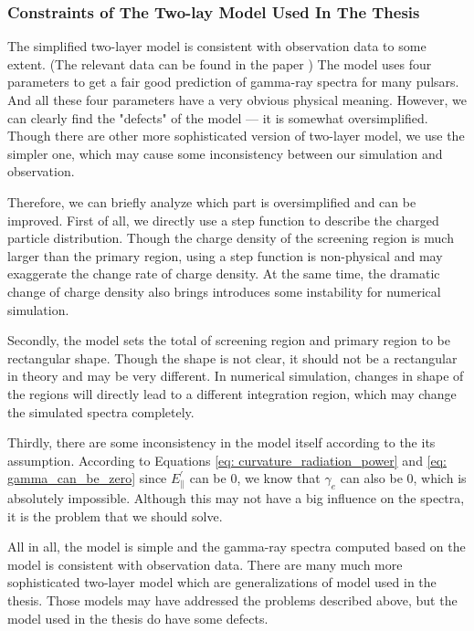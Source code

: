 \documentclass[12pt]{report}
\begin{document}
      \subsubsection{Constraints of The Two-lay Model Used In The Thesis} 
        The simplified two-layer model is consistent with observation data to some extent. 
        (The relevant data can be found in the paper \cite{0004-637X-720-1-178})
        The model uses four parameters to get a fair good prediction of gamma-ray spectra for many 
        pulsars. And all these four parameters have a very obvious physical meaning. 
        However, we can clearly find the "defects" of the model --- it is somewhat oversimplified. 
        Though there are other more sophisticated version of two-layer model, we use the simpler one, 
        which may cause some inconsistency between our simulation and observation. 

        Therefore, we can briefly analyze which part is oversimplified and can be improved. 
        First of all, we directly use a step function to describe the charged particle distribution. 
        Though the charge density of the screening region is much larger than the primary region, using 
        a step function is non-physical and may exaggerate the change rate of charge density. At the 
        same time, the dramatic change of charge density also brings introduces some instability for 
        numerical simulation. 

        Secondly, the model sets the total of screening region and primary region to be rectangular shape. 
        Though the shape is not clear, it should not be a rectangular in theory and may be very different.
        In numerical simulation, changes in shape of the regions will directly lead to a different 
        integration region, which may change the simulated spectra completely.

        Thirdly, there are some inconsistency in the model itself according to the its assumption. 
        According to Equations \ref{eq: curvature_radiation_power} and \ref{eq: gamma_can_be_zero}
        since $E_{\parallel}^{\prime}$ can be $0$, we know that 
        $\gamma_{e}$ can also be $0$, which is absolutely impossible. Although this may not have a big 
        influence on the spectra, it is the problem that we should solve. 

        All in all, the model is simple and the gamma-ray spectra computed based on the model is 
        consistent with observation data. There are many much more sophisticated two-layer model 
        which are generalizations of model used in the thesis. Those models may have addressed the 
        problems described above, but the model used in the thesis do have some defects. 
\end{document}

